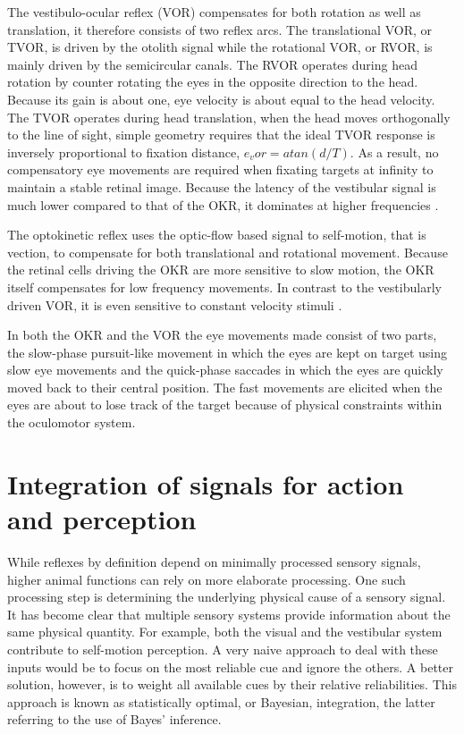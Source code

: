 The vestibulo-ocular reflex (VOR) compensates for both rotation as well as translation, it therefore consists of two reflex arcs. The translational VOR, or TVOR, is driven by the otolith signal while the rotational VOR, or RVOR, is mainly driven by the semicircular canals. The RVOR operates during head rotation by counter rotating the eyes in the opposite direction to the head. Because its gain is about one, eye velocity is about equal to the head velocity. The TVOR operates during head translation, when the head moves orthogonally to the line of sight, simple geometry requires that the ideal TVOR response is inversely proportional to fixation distance, $e_vor = atan⁡(d/T)$. As a result, no compensatory eye movements are required when fixating targets at infinity to maintain a stable retinal image. Because the latency of the vestibular signal is much lower compared to that of the OKR, it dominates at higher frequencies \cite{schweigard1997}.

The optokinetic reflex uses the optic-flow based signal to self-motion, that is vection, to compensate for both translational and rotational movement. Because the retinal cells driving the OKR are more sensitive to slow motion, the OKR itself compensates for low frequency movements. In contrast to the vestibularly driven VOR, it is even sensitive to constant velocity stimuli \cite{soodak1988}.

In both the OKR and the VOR the eye movements made consist of two parts, the slow-phase pursuit-like movement in which the eyes are kept on target using slow eye movements and the quick-phase saccades in which the eyes are quickly moved back to their central position. The fast movements are elicited when the eyes are about to lose track of the target because of physical constraints within the oculomotor system.



\section{Integration of signals for action and perception}

While reflexes by definition depend on minimally processed sensory signals, higher animal functions can rely on more elaborate processing. One such processing step is determining the underlying physical cause of a sensory signal. It has become clear that multiple sensory systems provide information about the same physical quantity. For example, both the visual and the vestibular system contribute to self-motion perception. A very naive approach to deal with these inputs would be to focus on the most reliable cue and ignore the others. A better solution, however, is to weight all available cues by their  relative reliabilities. This approach is known as statistically optimal, or Bayesian, integration, the latter referring to the use  of Bayes' inference. 

